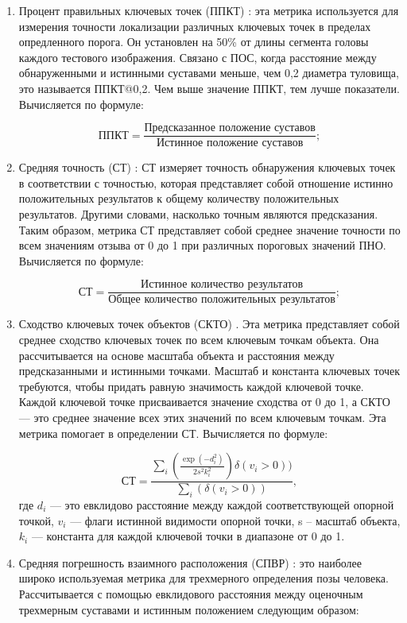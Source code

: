 \begin{enumerate}[label=\arabic*)]
	\item Процент правильных ключевых точек  (ППКТ) \cite{guide-hpe}: эта метрика используется для измерения точности локализации различных ключевых точек в пределах опредленного порога.
	Он установлен на 50\% от длины сегмента головы каждого тестового изображения.
	Связано с ПОС, когда расстояние между обнаруженными и истинными суставами меньше, чем 0,2 диаметра туловища, это называется ППКТ@0,2.
	Чем выше значение ППКТ, тем лучше показатели.
	Вычисляется по формуле:
	
	\begin{equation}
		\text{ППКТ} = \frac{\text{Предсказанное положение суставов}}{\text{Истинное положение суставов}};
	\end{equation}
	
	\item Средняя точность (СТ) \cite{guide-hpe}: СТ измеряет точность обнаружения ключевых точек в соответствии с точностью, которая представляет собой отношение истинно положительных результатов к общему количеству положительных результатов.
	Другими словами, насколько точным являются предсказания. 
	Таким образом, метрика СТ представляет собой среднее значение точности по всем значениям отзыва от 0 до 1 при различных пороговых значений ПНО.
	Вычисляется по формуле:
	
	\begin{equation}
		\text{СТ} = \frac{\text{Истинное количество результатов}}{\text{Общее количество положительных результатов}};
	\end{equation}
	
	\item Сходство ключевых точек объектов (СКТО) \cite{COCO}. Эта метрика представляет собой среднее сходство ключевых точек по всем ключевым точкам объекта.
	Она рассчитывается на основе масштаба объекта и расстояния между предсказанными и истинными точками.
	Масштаб и константа ключевых точек требуются, чтобы придать равную значимость каждой ключевой точке.
	Каждой ключевой точке присваивается значение сходства от 0 до 1, а СКТО --- это среднее значение всех этих значений по всем ключевым точкам.
	Эта метрика помогает в определении СТ.
	Вычисляется по формуле:
	
	\begin{equation}
		\text{СТ} = \frac{\sum_i(\frac{\exp(-d_i^2)}{2s^2k_i^2})\delta(v_i>0))}{\sum_i(\delta(v_i > 0))},
	\end{equation}
	где $d_i$ --- это евклидово расстояние между каждой соответствующей опорной точкой, $v_i$ --- флаги истинной видимости опорной точки, s -- масштаб объекта, $k_i$ --- константа для каждой ключевой точки в диапазоне от 0 до 1.  
	\item Средняя погрешность взаимного расположения (СПВР) \cite{COCO}: это наиболее широко используемая метрика для трехмерного определения позы человека.
	Рассчитывается с помощью евклидового расстояния между оценочным трехмерным суставами и истинным положением следующим образом:
	

\end{enumerate}
